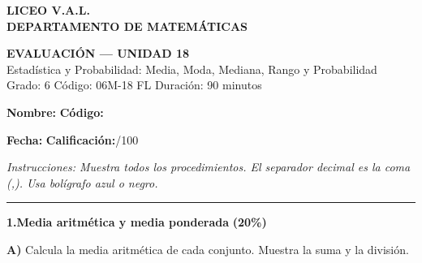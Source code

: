 \documentclass[12pt, letterpaper]{article}
\begin{document}
	
	\begin{center}
		{\Large\textbf{LICEO V.A.L.}}\\[0.25cm]
		{\normalsize\textbf{DEPARTAMENTO DE MATEMÁTICAS}}\\[0.25cm]
		\begin{tcolorbox}[colback=valblue!10, colframe=valblue,
			width=14cm, arc=3mm, boxrule=1.5pt]
			\centering
			{\Large\textbf{EVALUACIÓN — UNIDAD 18}}\\[0.1cm]
			\normalsize Estadística y Probabilidad: Media, Moda, Mediana, Rango y
			Probabilidad\\[0.1cm]
			\small Grado: 6\textdegree\quad
			Código: 06M-18 FL\quad
			Duración: 90 minutos
		\end{tcolorbox}
	\end{center}
	
	\vspace{0.3cm}
	\noindent
	\textbf{Nombre:}\;\underline{\hspace{7.8cm}}
	\hfill\textbf{Código:}\;\underline{\hspace{2.5cm}}
	
	\vspace{0.2cm}
	\noindent
	\textbf{Fecha:}\;\underline{\hspace{7.8cm}}
	\hfill\textbf{Calificación:}\;\underline{\hspace{1.8cm}}/100
	
	\vspace{0.3cm}
	\noindent\textit{\small Instrucciones: Muestra todos los procedimientos.
		El separador decimal es la coma (,). Usa bolígrafo azul o negro.}
	
	\vspace{0.4cm}\noindent\rule{14cm}{0.8pt}\vspace{0.3cm}
	
	\noindent\textbf{1.\;Media aritmética y media ponderada}
	\hfill\textbf{(20\%)}
	
	\vspace{0.3cm}
	\textbf{A)} Calcula la media aritmética de cada conjunto.
	Muestra la suma y la división.
	
\end{document}
